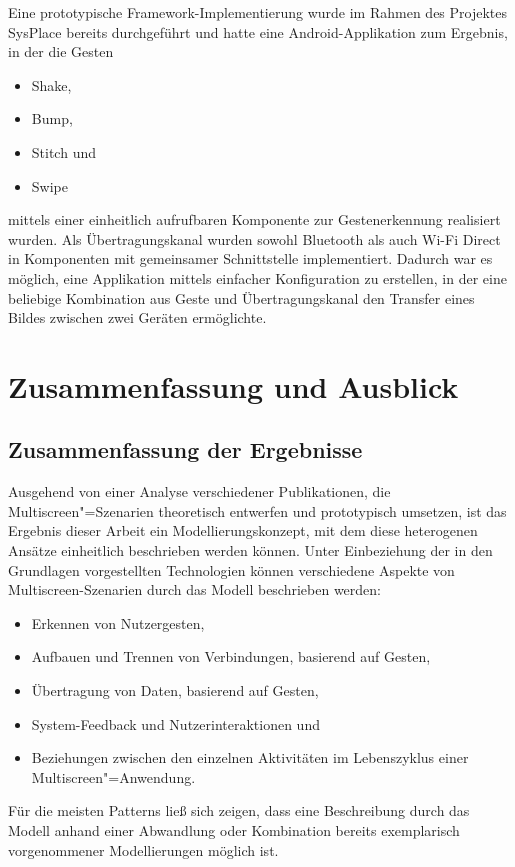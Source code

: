 Eine prototypische Framework-Implementierung wurde im Rahmen des Projektes SysPlace bereits durchgeführt und hatte eine Android-Applikation zum Ergebnis, in der die Gesten
\begin{itemize}
\item Shake,
\item Bump,
\item Stitch und
\item Swipe 
\end{itemize}
mittels einer einheitlich aufrufbaren Komponente zur Gestenerkennung realisiert wurden. Als Übertragungskanal wurden sowohl Bluetooth als auch Wi-Fi Direct in Komponenten mit gemeinsamer Schnittstelle implementiert. Dadurch war es möglich, eine Applikation mittels einfacher Konfiguration zu erstellen, in der eine beliebige Kombination aus Geste und Übertragungskanal den Transfer eines Bildes zwischen zwei Geräten ermöglichte. 

\chapter{Zusammenfassung und Ausblick}
\label{ch:zusammenfassung}
\section{Zusammenfassung der Ergebnisse}
Ausgehend von einer Analyse verschiedener Publikationen, die Multiscreen"=Szenarien theoretisch entwerfen und prototypisch umsetzen, ist das Ergebnis dieser Arbeit ein Modellierungskonzept, mit dem diese heterogenen Ansätze einheitlich beschrieben werden können. Unter Einbeziehung der in den Grundlagen vorgestellten Technologien können verschiedene Aspekte von Multiscreen-Szenarien durch das Modell beschrieben werden:
\begin{itemize}
\item Erkennen von Nutzergesten,
\item Aufbauen und Trennen von Verbindungen, basierend auf Gesten,
\item Übertragung von Daten, basierend auf Gesten,
\item System-Feedback und Nutzerinteraktionen und
\item Beziehungen zwischen den einzelnen Aktivitäten im Lebenszyklus einer Multiscreen"=Anwendung.
\end{itemize}

Für die meisten Patterns ließ sich zeigen, dass eine Beschreibung durch das Modell anhand einer Abwandlung oder Kombination bereits exemplarisch vorgenommener Modellierungen möglich ist.

